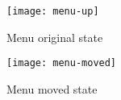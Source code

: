 \begin{center}
	\begin{figure}[h]
		\centering
		\texttt{[image: menu-up]}\\
		\caption{Menu original state}
		\label{menu-up}
	\end{figure}
	
	\begin{figure}[h]
		\centering
		\texttt{[image: menu-moved]}\\
		\caption{Menu moved state}
		\label{menu-moved}
	\end{figure}
\end{center}

\clearpage